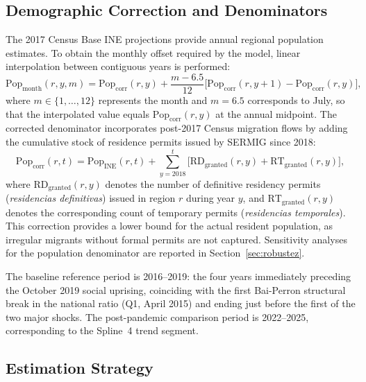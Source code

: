 \documentclass[pdflatex,sn-basic]{sn-jnl}
\begin{document}
\subsection{Demographic Correction and Denominators}
\label{sub:pop}

The 2017 Census Base INE projections provide annual regional population estimates. To obtain the monthly offset required by the model, linear interpolation between contiguous years is performed:
\[
  \text{Pop}_{\text{month}}(r,y,m)
  = \text{Pop}_{\text{corr}}(r,y)
  + \frac{m - 6.5}{12}
  \bigl[\text{Pop}_{\text{corr}}(r,y+1) - \text{Pop}_{\text{corr}}(r,y)\bigr],
\]
where $m \in \{1,\ldots,12\}$ represents the month and $m=6.5$ corresponds to July, so that the interpolated value equals $\text{Pop}_{\text{corr}}(r,y)$ at the annual midpoint. The corrected denominator incorporates post-2017 Census migration flows by adding the cumulative stock of residence permits issued by SERMIG since 2018:
\[
  \text{Pop}_{\text{corr}}(r,t)
  = \text{Pop}_{\text{INE}}(r,t)
  + \sum_{y=2018}^{t}\bigl[\text{RD}_{\text{granted}}(r,y) + \text{RT}_{\text{granted}}(r,y)\bigr],
\]
where $\text{RD}_{\text{granted}}(r,y)$ denotes the number of definitive residency permits (\textit{residencias definitivas}) issued in region $r$ during year $y$, and $\text{RT}_{\text{granted}}(r,y)$ denotes the corresponding count of temporary permits (\textit{residencias temporales}). This correction provides a lower bound for the actual resident population, as irregular migrants without formal permits are not captured. Sensitivity analyses for the population denominator are reported in Section~\ref{sec:robustez}.

The baseline reference period is 2016--2019: the four years immediately preceding the October 2019 social uprising, coinciding with the first Bai-Perron structural break in the national ratio (Q1, April 2015) and ending just before the first of the two major shocks. The post-pandemic comparison period is 2022--2025, corresponding to the Spline~4 trend segment.

\subsection{Estimation Strategy}
\end{document}
